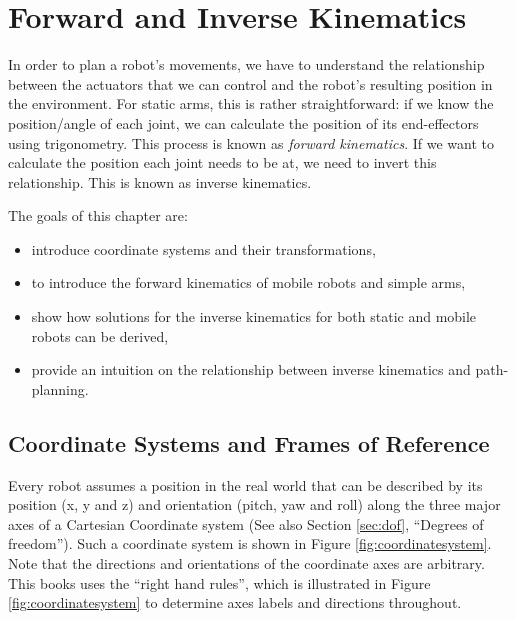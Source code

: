 \chapter{Forward and Inverse Kinematics}\label{chap:kinematics}
In order to plan a robot's movements, we have to understand the relationship between the actuators that we can control and the robot's resulting position in the environment. For static arms, this is rather straightforward: if we know the position/angle of each joint, we can calculate the position of its end-effectors using trigonometry. This process is known as \emph{forward kinematics}.  If we want to calculate the position each joint needs to be at, we need to invert this relationship. This is known as inverse kinematics. 

The goals of this chapter are:

\begin{itemize}
\item introduce coordinate systems and their transformations,
\item to introduce the forward kinematics of mobile robots and simple arms,
\item show how solutions for the inverse kinematics for both static and mobile robots can be derived,
\item provide an intuition on the relationship between inverse kinematics and path-planning.
\end{itemize}

\section{Coordinate Systems and Frames of Reference}\label{sec:coordsystems}
Every robot assumes a position in the real world that can be described by its position (x, y and z) and orientation (pitch, yaw and roll) along the three major axes of a Cartesian Coordinate system (See also Section \ref{sec:dof}, ``Degrees of freedom''). Such a coordinate system is shown in Figure \ref{fig:coordinatesystem}. Note that the directions and orientations of the coordinate axes are arbitrary. This books uses the ``right hand rules'', which is illustrated in Figure \ref{fig:coordinatesystem} to determine axes labels and directions throughout.


